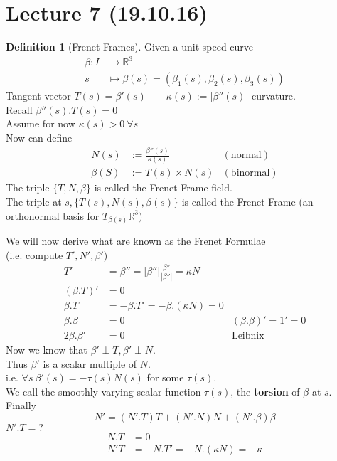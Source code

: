 \documentclass{article}
\newcommand{\R}{\mathbb{R}}
\theoremstyle{definition}
\newtheorem{definition}{Definition}[section]
\theoremstyle{remark}
\theoremstyle{example}
\begin{document}
	\section*{Lecture 7 (19.10.16)}
	\begin{definition}[Frenet Frames]
		Given a unit speed curve
		\begin{align*}
		\beta : I &\to \R^3\\
		s & \mapsto \beta(s)=(\beta_1(s),\beta_2(s),\beta_3(s))
		\end{align*}
		Tangent vector $T(s)=\beta'(s)\qquad \kappa(s):=|\beta''(s)|$ curvature.\\
		Recall $\beta''(s).T(s)=0$\\
		Assume for now $\kappa(s)>0\ \forall s$\\
		Now can define \begin{align*}
		N(s)&:=\frac{\beta''(s)}{\kappa(s)}&\mathrm{(normal)}\\
		\beta(S)&:=T(s) \times N(s) & \mathrm{(binormal)}
		\end{align*}
		The triple $\{T,N,\beta\}$ is called the Frenet Frame field.\\
		The triple at $s, \{T(s),N(s),\beta(s)\}$ is called the Frenet Frame (an orthonormal basis for $T_{\beta(s)}\R^3)$
	\end{definition}
	We will now derive what are known as the Frenet Formulae\\(i.e. compute $T',N',\beta'$)
	\begin{align*}
		T'&=\beta''=|\beta''|\frac{\beta''}{|\beta''|}=\kappa N\\
		(\beta . T)'&=0\\
		\beta . T & = -\beta . T' = - \beta . (\kappa N) = 0\\
		\beta . \beta &= 0 & (\beta . \beta)'=1'=0\\
		2\beta.\beta'&=0 & \mathrm{Leibnix}
	\end{align*}
	Now we know that $\beta' \perp T,  \beta' \perp N$.\\
	Thus $\beta'$ is a scalar multiple of $N$.\\
	i.e. $\forall s\ \beta'(s)=-\tau(s)N(s)$ for some $\tau(s)$.\\
	We call the smoothly varying scalar function $\tau(s)$, the \textbf{torsion} of $\beta$ at $s$.\\
	Finally \[N'=(N'.T)T+(N'.N)N+(N'.\beta)\beta \]
	$N'.T=?$
	\begin{align*}
		N.T & = 0\\
		N'T & = -N.T'=-N.(\kappa N)=-\kappa
	\end{align*}
\end{document}
